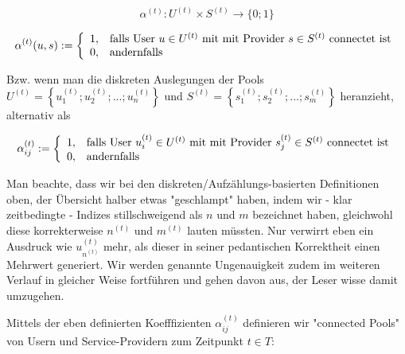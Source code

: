 \documentclass[11pt]{scrartcl}
\begin{document}
\begin{Def}\label{defKoeff}
\begin{equation*}
  \alpha^{(t)} : U^{(t)} \times S^{(t)} \rightarrow \{0; 1\} 
\end{equation*}

\[
\alpha^{(t)}(u, s):=\left\{%
\begin{array}{ll}
    1, & \hbox{falls User $u \in U^{(t)}$ mit mit Provider $s \in S^{(t)}$ connectet ist} \\
    0, & \hbox{andernfalls} \\
\end{array}%
\right.
\]

\vspace{1cm}

Bzw. wenn man die diskreten Auslegungen der Pools $U^{(t)} = \left\{ u^{(t)}_1; u^{(t)}_2;...; u^{(t)}_{n} \right\}$ und $S^{(t)} = \left\{ s^{(t)}_1; s^{(t)}_2;...; s^{(t)}_{m} \right\}$ heranzieht, alternativ als

\[
\alpha^{(t)}_{ij}:=\left\{%
\begin{array}{ll}
    1, & \hbox{falls User $u^{(t)}_i \in U^{(t)}$ mit mit Provider $s^{(t)}_j \in S^{(t)}$ connectet ist} \\
    0, & \hbox{andernfalls} \\
\end{array}%
\right.
\]

\end{Def}

\vspace{1cm}

Man beachte, dass wir bei den diskreten/Aufzählungs-basierten Definitionen oben, der Übersicht halber etwas "geschlampt" haben, indem wir - klar zeitbedingte - Indizes stillschweigend als $n$ und $m$ bezeichnet haben, gleichwohl diese korrekterweise $n^{(t)}$ und $m^{(t)}$ lauten müssten. Nur verwirrt eben ein Ausdruck wie $u^{(t)}_{n^{(t)}}$ mehr, als dieser in seiner pedantischen Korrektheit einen Mehrwert generiert. Wir werden genannte Ungenauigkeit zudem im weiteren Verlauf in gleicher Weise fortführen und gehen davon aus, der Leser wisse damit umzugehen. 

\vspace{0.3cm}

Mittels der eben definierten Koefffizienten $\alpha^{(t)}_{ij}$ definieren wir "connected Pools" von Usern und Service-Providern zum Zeitpunkt $t \in T$:

\vspace{1cm}
\end{document}
